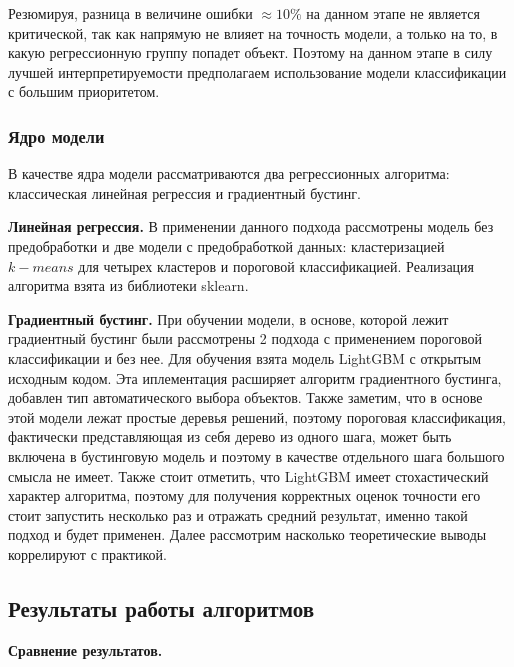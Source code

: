 \documentclass[12pt,a4paper]{article} %
\begin{document}
Резюмируя, разница в величине ошибки $\approx10\%$ на данном этапе не является критической, так как напрямую не влияет на точность модели, а только на то, в какую регрессионную группу попадет объект. Поэтому на данном этапе в силу лучшей интерпретируемости предполагаем использование модели классификации с большим приоритетом.  

\subsubsection{Ядро модели}

В качестве ядра модели рассматриваются два регрессионных алгоритма: классическая линейная регрессия и градиентный бустинг. 

\textbf{Линейная регрессия.} В применении данного подхода рассмотрены модель без предобработки и две модели с предобработкой данных: кластеризацией $k-means$ для четырех кластеров и пороговой классификацией. Реализация алгоритма взята из библиотеки sklearn.

\textbf{Градиентный бустинг.} При обучении модели, в основе, которой лежит градиентный бустинг были рассмотрены 2 подхода с применением пороговой классификации и без нее. Для обучения взята модель LightGBM с открытым исходным кодом. Эта иплементация расширяет алгоритм градиентного бустинга, добавлен тип автоматического выбора объектов. Также заметим, что в основе этой модели лежат простые деревья решений, поэтому пороговая классификация, фактически представляющая из себя дерево из одного шага, может быть включена в бустинговую модель и поэтому в качестве отдельного шага большого смысла не имеет. Также стоит отметить, что LightGBM имеет стохастический характер алгоритма, поэтому для получения корректных оценок точности его стоит запустить несколько раз и отражать средний результат, именно такой подход и будет применен. Далее рассмотрим насколько теоретические выводы коррелируют с практикой.

\newpage

\subsection{Результаты работы алгоритмов}

\textbf{Сравнение результатов.} 
\end{document}
